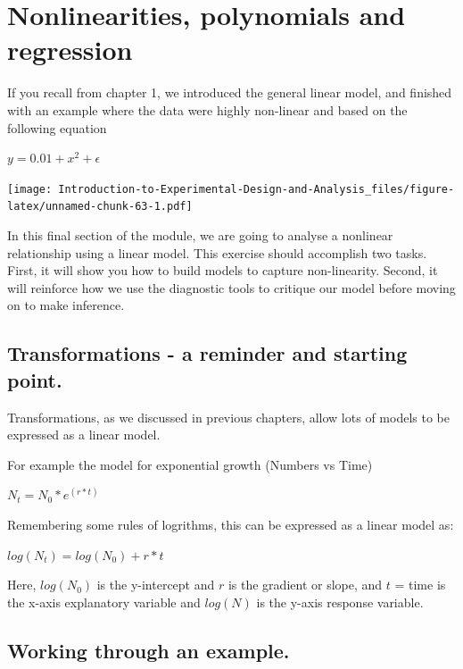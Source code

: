 \documentclass[
]{book}
\begin{document}
\hypertarget{nonlinearities-polynomials-and-regression}{%
\chapter{Nonlinearities, polynomials and regression}\label{nonlinearities-polynomials-and-regression}}

If you recall from chapter 1, we introduced the general linear model, and finished with an example where the data were highly non-linear and based on the following equation

\(y = 0.01 + x^{2} + \epsilon\)

\texttt{[image: Introduction-to-Experimental-Design-and-Analysis\_files/figure-latex/unnamed-chunk-63-1.pdf]}

In this final section of the module, we are going to analyse a nonlinear relationship using a linear model. This exercise should accomplish two tasks. First, it will show you how to build models to capture non-linearity. Second, it will reinforce how we use the diagnostic tools to critique our model before moving on to make inference.

\hypertarget{transformations---a-reminder-and-starting-point.}{%
\section{Transformations - a reminder and starting point.}\label{transformations---a-reminder-and-starting-point.}}

Transformations, as we discussed in previous chapters, allow lots of models to be expressed as a linear model.

For example the model for exponential growth (Numbers vs Time)

\(N_{t}=N_{0}*e^{(r*t)}\)

Remembering some rules of logrithms, this can be expressed as a linear model as:

\(log(N_{t})=log(N_{0}) + r*t\)

Here, \(log(N_{0})\) is the y-intercept and \(r\) is the gradient or slope, and \(t\) = time is the x-axis explanatory variable and \(log(N)\) is the y-axis response variable.

\hypertarget{working-through-an-example.}{%
\section{Working through an example.}\label{working-through-an-example.}}
\end{document}
